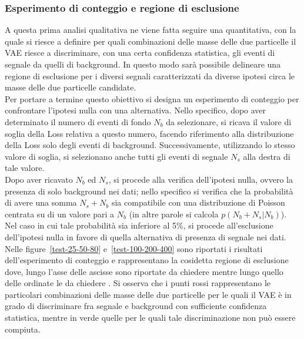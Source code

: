 \subsubsection{Esperimento di conteggio e regione di esclusione}
\label{esperimento di conteggio e regione di esclusione}

A questa prima analisi qualitativa ne viene fatta seguire una quantitativa, con la quale si riesce a definire per quali combinazioni delle masse delle due particelle il VAE riesce a discriminare, con una certa confidenza statistica, gli eventi di segnale da quelli di background. In questo modo sarà possibile delineare una regione di esclusione per i diversi segnali caratterizzati da diverse ipotesi circa le masse delle due particelle candidate.\\
Per portare a termine questo obiettivo si designa un esperimento di conteggio per confrontare l'ipotesi nulla con una alternativa. Nello specifico, dopo aver determinato il numero di eventi di fondo $N_b$ da selezionare, si ricava il valore di soglia della Loss relativa a questo numero, facendo riferimento alla distribuzione della Loss solo degli eventi di background. Successivamente, utilizzando lo stesso valore di soglia, si selezionano anche tutti gli eventi di segnale $N_s$ alla destra di tale valore.\\
Dopo aver ricavato $N_b$ ed $N_s$, si procede alla verifica dell'ipotesi nulla, ovvero la presenza di solo background nei dati; nello specifico si verifica che la probabilità di avere una somma $N_s + N_b$ sia compatibile con una distribuzione di Poisson centrata su di un valore pari a $N_b$ (in altre parole si calcola $p(N_b + N_s | N_b)$). Nel caso in cui tale probabilità sia inferiore al 5\%, si procede all'esclusione dell'ipotesi nulla in favore di quella alternativa di presenza di segnale nei dati.\\
Nelle figure~\ref{test-25-50-80} e~\ref{test-100-200-400} sono riportati i risultati dell'esperimento di conteggio e rappresentano la cosidetta  regione di esclusione dove, lungo l'asse delle ascisse sono riportate \color{red} da chiedere \color{black} mentre lungo quello delle ordinate le \color{red} da chiedere \color{black}. Si osserva che i punti rossi rappresentano le particolari combinazioni delle masse delle due particelle per le quali il VAE è in grado di discriminare fra segnale e background con sufficiente confidenza statistica, mentre in verde quelle per le quali tale discriminazione non può essere compiuta.

\newpage

